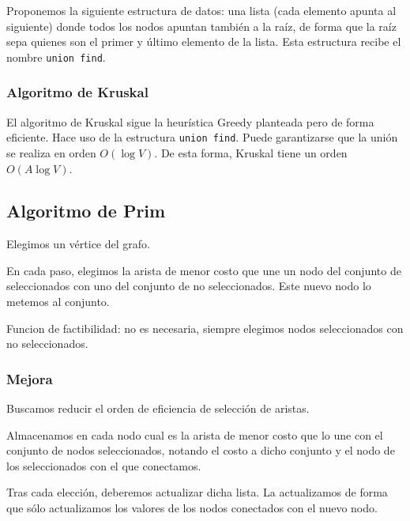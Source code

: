 Proponemos la siguiente estructura de datos: una lista (cada elemento apunta al siguiente) donde todos los nodos apuntan también a la raíz, de forma que la raíz sepa quienes son el primer y último elemento de la lista. Esta estructura recibe el nombre \verb|union find|.

\subsubsection{Algoritmo de Kruskal}
El algoritmo de Kruskal sigue la heurística Greedy planteada pero de forma eficiente. Hace uso de la estructura \verb|union find|. Puede garantizarse que la unión se realiza en orden $O(\log V)$. De esta forma, Kruskal tiene un orden $O(A\log V)$.

\subsection{Algoritmo de Prim}
Elegimos un vértice del grafo. 

En cada paso, elegimos la arista de menor costo que une un nodo del conjunto de seleccionados con uno del conjunto de no seleccionados. Este nuevo nodo lo metemos al conjunto.

Funcion de factibilidad: no es necesaria, siempre elegimos nodos seleccionados con no seleccionados.

\subsubsection{Mejora}
Buscamos reducir el orden de eficiencia de selección de aristas.

Almacenamos en cada nodo cual es la arista de menor costo que lo une con el conjunto de nodos seleccionados, notando el costo a dicho conjunto y el nodo de los seleccionados con el que conectamos.

Tras cada elección, deberemos actualizar dicha lista.
La actualizamos de forma que sólo actualizamos los valores de los nodos conectados con el nuevo nodo.
